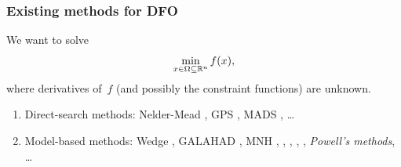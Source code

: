 \documentclass{polyu-presentation}
\newcommand{\fset}{\Omega}
\newcommand{\iter}[1][]{x\ifthenelse{\equal{#1}{}}{}{^{#1}}}
\newcommand{\obj}{f}
\begin{document}
\begin{frame}
    \frametitle{Existing methods for DFO}

    We want to solve
    \begin{equation*}
        \min_{\iter \in \fset \subseteq \R^n} \obj(\iter),
    \end{equation*}
    where derivatives of~$\obj$ (and possibly the constraint functions) are \alert{unknown}.

    \bigskip

    \begin{block}{}
        \begin{enumerate}
            \item \alert{Direct-search methods}: Nelder-Mead \parencite{Nelder_Mead_1965}, GPS \parencite{Booker_Etal_1999}, MADS \parencite{Audet_Dennis_2006}, \dots
            \item \alert{Model-based methods}: Wedge \parencite{Marazzi_Nocedal_2002}, GALAHAD \parencite{Gould_Orban_Toint_2003}, MNH \parencite{Wild_2008}, \textcite{Fasano_Morales_Nocedal_2009}, \textcite{Conejo_Karas_Pedroso_2015}, \textcite{Audet_Digabel_Peyrega_2016}, \textcite{Jarre_Lieder_2017}, \emph{Powell's methods}, \dots
        \end{enumerate}
    \end{block}
    
\end{frame}
\end{document}
